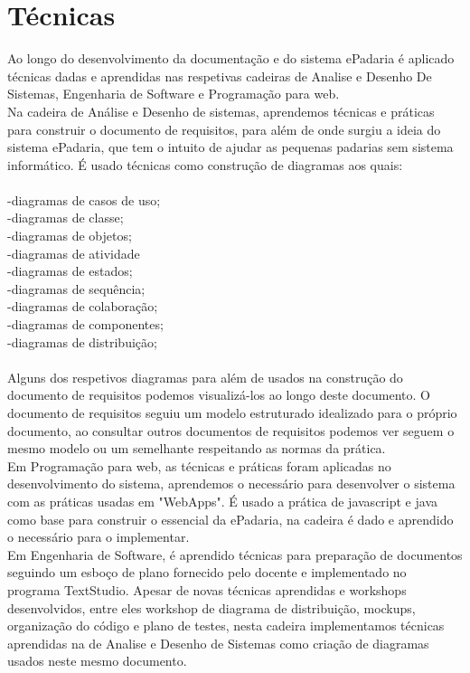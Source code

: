 \section{Técnicas}
Ao longo do desenvolvimento da documentação e do sistema ePadaria é aplicado técnicas dadas e aprendidas nas respetivas cadeiras de Analise e Desenho De Sistemas, Engenharia de Software e Programação para web.\\
Na cadeira de Análise e Desenho de sistemas, aprendemos técnicas e práticas para construir o documento de requisitos, para além de onde surgiu a ideia do sistema ePadaria, que tem o intuito de ajudar as pequenas padarias sem sistema informático. É usado técnicas como construção de diagramas aos quais:\\ 
\\-diagramas de casos de uso;\\ 
-diagramas de classe;\\
-diagramas de objetos;\\
-diagramas de atividade\\
-diagramas de estados;\\
-diagramas de sequência;\\
-diagramas de colaboração;\\
-diagramas de componentes;\\
-diagramas de distribuição;\\
\\Alguns dos respetivos diagramas para além de usados na construção do documento de requisitos podemos visualizá-los ao longo deste documento. O documento de requisitos seguiu um modelo estruturado idealizado para o próprio documento, ao consultar outros documentos de requisitos podemos ver seguem o mesmo modelo ou um semelhante respeitando as normas da prática.\\
Em Programação para web, as técnicas e práticas foram aplicadas no desenvolvimento do sistema, aprendemos o necessário para desenvolver o sistema com as práticas usadas em "WebApps". É usado a prática de javascript e java como base para construir o essencial da ePadaria, na cadeira é dado e aprendido o necessário para o implementar.\\
Em Engenharia de Software, é aprendido técnicas para preparação de documentos seguindo um esboço de plano fornecido pelo docente e implementado no programa TextStudio. Apesar de novas técnicas aprendidas e workshops desenvolvidos, entre eles workshop de diagrama de distribuição, mockups, organização do código e plano de testes, nesta cadeira implementamos técnicas aprendidas na de Analise e Desenho de Sistemas como criação de diagramas usados neste mesmo documento.\\ 


